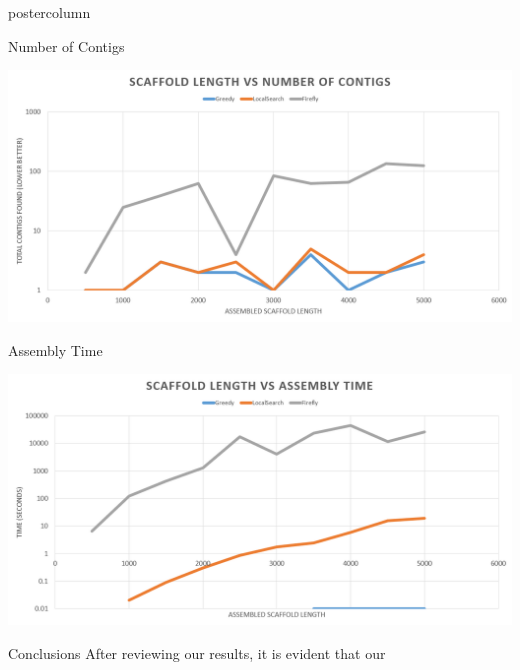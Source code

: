 \documentclass[final,hyperref={pdfpagelabels=false}]{beamer}
\newlength{\columnheight}
\begin{document}
\begin{frame}
\begin{columns}
        \begin{column}{.32\textwidth}
            \begin{beamercolorbox}[center,wd=\textwidth]{postercolumn}
                \begin{minipage}[T]{.95\textwidth}
                    \parbox[t][\columnheight]{\textwidth}{
                        \begin{block}{Number of Contigs}
                            \begin{center}
                                \includegraphics[scale=0.66]{num_contigs_poster}
                            \end{center}
                        \end{block}
                        \begin{block}{Assembly Time}
                            \begin{center}
                                \includegraphics[scale=0.66]{assembly_time_poster}
                            \end{center}
                        \end{block}
                        \begin{block}{Conclusions}
                            After reviewing our results, it is evident that our

\end{block}}
\end{minipage}
\end{beamercolorbox}
\end{column}
\end{columns}
\end{frame}
\end{document}
